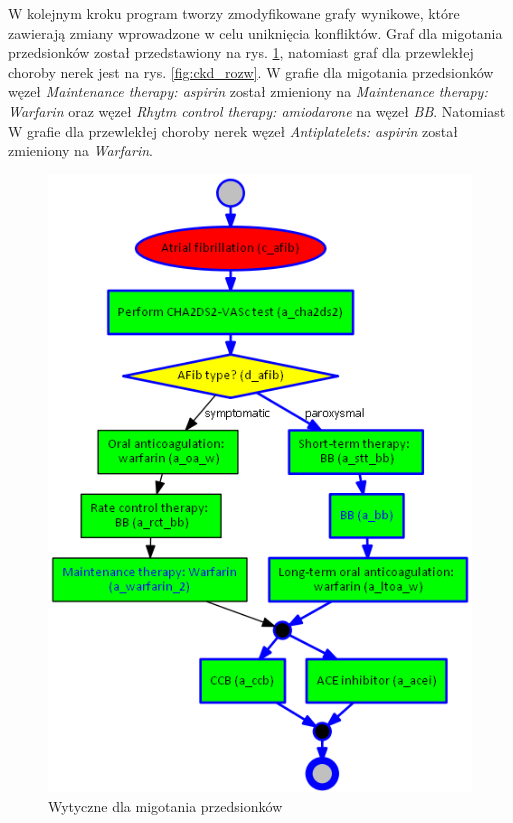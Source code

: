 W kolejnym kroku program tworzy zmodyfikowane grafy wynikowe, które zawierają zmiany wprowadzone w celu uniknięcia konfliktów. Graf dla migotania przedsionków został przedstawiony na rys. \ref{fig:afib_rozw}, natomiast graf dla przewlekłej choroby nerek jest na rys. \ref{fig:ckd_rozw}. W grafie dla migotania przedsionków węzeł \textit{Maintenance therapy: aspirin} został zmieniony na \textit{Maintenance therapy: Warfarin} oraz węzeł \textit{Rhytm control therapy: amiodarone} na węzeł \textit{BB}. Natomiast W grafie dla przewlekłej choroby nerek węzeł \textit{Antiplatelets: aspirin} został zmieniony na \textit{Warfarin}.

\begin{figure}[H]
\centering
\includegraphics[scale=0.5]{img/rozwiazanie1afib-ver-4_przyklad.png}
\caption{Wytyczne dla migotania przedsionków}
\label{fig:afib_rozw}
\end{figure}
